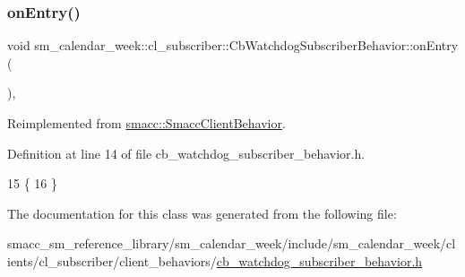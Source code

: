 \subsubsection{\texorpdfstring{on\+Entry()}{onEntry()}}
{\footnotesize\ttfamily void sm\+\_\+calendar\+\_\+week\+::cl\+\_\+subscriber\+::\+Cb\+Watchdog\+Subscriber\+Behavior\+::on\+Entry (\begin{DoxyParamCaption}{ }\end{DoxyParamCaption})\hspace{0.3cm}{\ttfamily [inline]}, {\ttfamily [virtual]}}



Reimplemented from \hyperlink{classsmacc_1_1SmaccClientBehavior_a7962382f93987c720ad432fef55b123f}{smacc\+::\+Smacc\+Client\+Behavior}.



Definition at line 14 of file cb\+\_\+watchdog\+\_\+subscriber\+\_\+behavior.\+h.


\begin{DoxyCode}
15     \{
16     \}
\end{DoxyCode}


The documentation for this class was generated from the following file\+:\begin{DoxyCompactItemize}
\item 
smacc\+\_\+sm\+\_\+reference\+\_\+library/sm\+\_\+calendar\+\_\+week/include/sm\+\_\+calendar\+\_\+week/clients/cl\+\_\+subscriber/client\+\_\+behaviors/\hyperlink{sm__calendar__week_2include_2sm__calendar__week_2clients_2cl__subscriber_2client__behaviors_2cb_36e06d0e8a2b4ac94bf461d1b035e759}{cb\+\_\+watchdog\+\_\+subscriber\+\_\+behavior.\+h}\end{DoxyCompactItemize}
